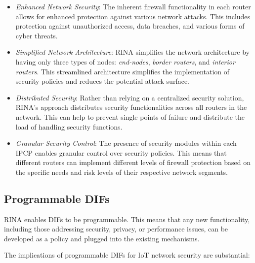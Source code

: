 \documentclass{ieeeaccess}
\begin{document}
\begin{itemize}
	\item \textit{Enhanced Network Security}: The inherent firewall functionality in each router allows for enhanced protection against various network attacks. This includes protection against unauthorized access, data breaches, and various forms of cyber threats.
	\item \textit{Simplified Network Architecture}: RINA simplifies the network architecture by having only three types of nodes: \textit{end-nodes}, \textit{border routers}, and \textit{interior routers}. This streamlined architecture simplifies the implementation of security policies and reduces the potential attack surface.
	\item \textit{Distributed Security}: Rather than relying on a centralized security solution, RINA's approach distributes security functionalities across all routers in the network. This can help to prevent single points of failure and distribute the load of handling security functions.	
	\item \textit{Granular Security Control}: The presence of security modules within each IPCP enables granular control over security policies. This means that different routers can implement different levels of firewall protection based on the specific needs and risk levels of their respective network segments.
\end{itemize}

\subsection{Programmable DIFs}
RINA enables DIFs to be programmable. This means that any new functionality, including those addressing security, privacy, or performance issues, can be developed as a policy and plugged into the existing mechanisms.

The implications of programmable DIFs for IoT network security are substantial:
\end{document}
